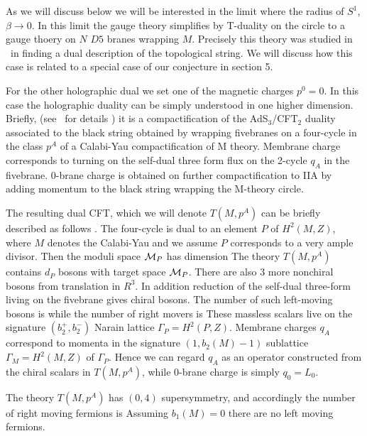  As we
will discuss below we will be interested in the limit where
the radius of $S^1$, $\beta\rightarrow 0$.  In this limit
the gauge theory simplifies by T-duality on the circle
to a gauge thoery on $N$ $D5$ branes wrapping $M$.  Precisely
this theory was studied in \inov\ in finding a dual description
of the topological string.  We will discuss how this case is related
to a special case of our conjecture in section 5.


For the other holographic dual we set one of
the magnetic charges $p^0=0$.  In this case the holographic duality can be
simply understood in one higher dimension.
Briefly, (see \msw\ for details ) it is a
compactification of the AdS$_3$/CFT$_2$ duality associated to the
black string obtained by wrapping fivebranes on a four-cycle in
the class $p^A$ of a Calabi-Yau compactification of M theory.
Membrane charge corresponds to turning on the self-dual three form
flux on the 2-cycle $q_A$ in the fivebrane. 0-brane charge is
obtained on further compactification to IIA by adding momentum to
the black string wrapping the M-theory circle.

 The resulting dual CFT, which
we will denote $T(M,p^A)$ can be briefly described as follows
\msw. The four-cycle is dual to an element $P$ of $H^2(M,Z)$,
where $M$ denotes the Calabi-Yau and we assume $P$ corresponds to
a very ample divisor. Then the moduli space ${\cal M}_P$ has dimension
\eqn{} The
theory $T(M,p^A)$ contains $d_P$ bosons with target space
${\cal M}_P$. There are also 3 more nonchiral bosons from translation
in $R^3$. In addition reduction of the self-dual three-form living
on the fivebrane gives chiral bosons. The number of such left-moving bosons is
\eqn{}
while the number of right movers is  \eqn{} These massless scalars live
on the signature $(b_2^+, b_2^-)$ Narain lattice
$\Gamma_P=H^2(P,Z)$.  Membrane charges $q_A$ correspond to momenta
in the signature $(1,b_2(M)-1)$ sublattice $\Gamma_M=H^2(M,Z)$ of
$\Gamma_P$. Hence we can regard $q_A$ as an operator constructed
from the chiral scalars in $T(M,p^A)$, while 0-brane charge is
simply  $q_0=L_0$.

The theory
$T(M,p^A)$  has $(0,4)$ supersymmetry, and accordingly the number
of right moving fermions is \eqn{} Assuming $b_1(M)=0$ there are
no left moving fermions.

